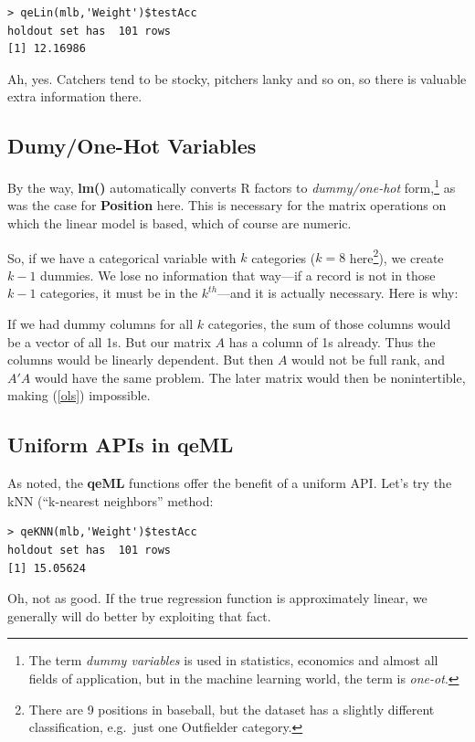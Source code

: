 \begin{lstlisting}
> qeLin(mlb,'Weight')$testAcc
holdout set has  101 rows
[1] 12.16986
\end{lstlisting}

Ah, yes.  Catchers tend to be stocky, pitchers lanky and so on, so there
is valuable extra information there.  

\subsection{Dumy/One-Hot Variables}

By the way, \textbf{lm()} automatically converts R factors to
\textit{dummy/one-hot} form,\footnote{The term \textit{dummy variables }
is used in statistics, economics and almost all fields of application,
but in the machine learning world, the term is \textit{one-ot}.} as was
the case for \textbf{Position} here.  This is necessary for the matrix
operations on which the linear model is based, which of course are
numeric. 

So, if we have a categorical variable with $k$ categories ($k =8$
here\footnote{There are 9 positions in baseball, but the dataset has a
slightly different classification, e.g.\ just one Outfielder
category.}), we create $k-1$ dummies.  We lose no information that
way---if a record is not in those $k-1$ categories, it must be in the
$k^{th}$---and it is actually necessary.  Here is why:

If we had dummy columns for all $k$ categories, the sum of those columns
would be a vector of all 1s.  But our matrix $A$ has a column of 1s
already.  Thus the columns would be linearly dependent.  But then $A$
would not be full rank, and $A'A$ would have the same problem.  The
later matrix would then be nonintertible, making (\ref{ols}) impossible.

\subsection{Uniform APIs in qeML}

As noted, the \textbf{qeML} functions offer the benefit of a uniform
API.  Let's try the kNN (``k-nearest neighbors'' method:

\begin{lstlisting}
> qeKNN(mlb,'Weight')$testAcc
holdout set has  101 rows
[1] 15.05624
\end{lstlisting}

Oh, not as good.  If the true regression function is approximately
linear, we generally will do better by exploiting that fact.

